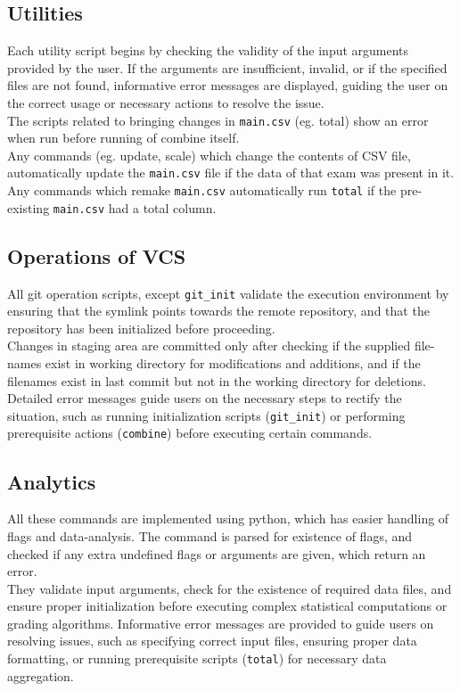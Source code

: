 \documentclass{article}
\begin{document}
\subsection{Utilities}
Each utility script begins by checking the validity of the input arguments provided by the user. If the arguments are insufficient, invalid, or if the specified files are not found, informative error messages are displayed, guiding the user on the correct usage or necessary actions to resolve the issue. \\
The scripts related to bringing changes in \texttt{main.csv} (eg. total) show an error when run before running of combine itself.\\
Any commands (eg. update, scale) which change the contents of CSV file, automatically update the \texttt{main.csv} file if the data of that exam was present in it.\\
Any commands which remake \texttt{main.csv} automatically run \texttt{total} if the pre-existing \texttt{main.csv} had a total column.\\ 

\subsection{Operations of VCS}
All git operation scripts, except \texttt{git\_init} validate the execution environment by ensuring that the symlink points towards the remote repository, and that the repository has been initialized before proceeding.\\
Changes in staging area are committed only after checking if the supplied file-names exist in working directory for modifications and additions, and if the filenames exist in last commit but not in the working directory for deletions.\\
Detailed error messages guide users on the necessary steps to rectify the situation, such as running initialization scripts (\texttt{git\_init}) or performing prerequisite actions (\texttt{combine}) before executing certain commands.\\

\subsection{Analytics}
All these commands are implemented using python, which has easier handling of flags and data-analysis. The command is parsed for existence of flags, and checked if any extra undefined flags or arguments are given, which return an error.\\
They validate input arguments, check for the existence of required data files, and ensure proper initialization before executing complex statistical computations or grading algorithms. Informative error messages are provided to guide users on resolving issues, such as specifying correct input files, ensuring proper data formatting, or running prerequisite scripts (\texttt{total}) for necessary data aggregation.\\
\end{document}
